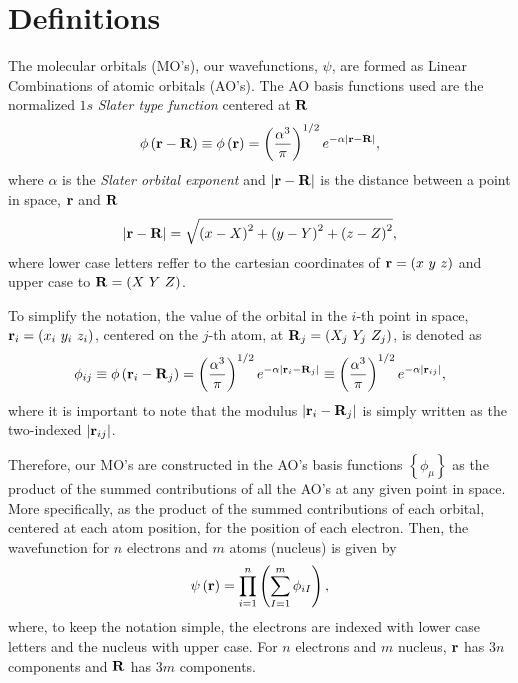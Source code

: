 \graphicspath{{./figures/}}

\section{Definitions}
The molecular orbitals (MO's), our wavefunctions, $\psi$, are formed as Linear
Combinations of atomic orbitals (AO's).
The AO basis functions used are the normalized $1s$ \textit{Slater type function} 
centered at $\boldsymbol{\mathrm{R}}$
\begin{equation}
    \phi \left( \boldsymbol{\mathrm{r}} - \boldsymbol{\mathrm{R}} \right) \equiv
    \phi \left( \boldsymbol{\mathrm{r}} \right) =
    \left( \frac{\alpha^3}{\pi} \right)^{1 /2}
    e^{-\alpha \left| \boldsymbol{\mathrm{r}} - \boldsymbol{\mathrm{R}} \right|}
    ,
\end{equation}
where $\alpha$ is the \textit{Slater orbital exponent} and 
$\left| \boldsymbol{\mathrm{r}} - \boldsymbol{\mathrm{R}} \right|$ is the distance between a point in space,
$ \boldsymbol{\mathrm{r}}$ and $ \boldsymbol{\mathrm{R}}$ 
\begin{equation} \label{eq:definition-mod-rR}
    \left| \boldsymbol{\mathrm{r}} - \boldsymbol{\mathrm{R}} \right|
    =
    \sqrt{\left( x - X \right)^{2} + \left( y - Y \right)^{2} + \left( z - Z \right)^{2}}
    ,
\end{equation}
where lower case letters reffer to the cartesian coordinates of 
$ \boldsymbol{\mathrm{r}} = \left( x\ y\ z \right)$ and upper case to 
$ \boldsymbol{\mathrm{R}} = \left( X\ Y\ Z \right)$.

To simplify the notation, the value of the orbital in the $i$-th point in space,
$\mat{r}_i = \left( x_i\ y_i\ z_i \right)$, centered on the $j$-th atom, at
$\boldsymbol{\mathrm{R}}_j = \left( X_j\ Y_j\ Z_j \right)$, is denoted as 
\begin{equation}
    \phi_{ij} \equiv
    \phi \left( \boldsymbol{\mathrm{r}}_i - \boldsymbol{\mathrm{R}}_j \right) =
    \left( \frac{\alpha^3}{\pi} \right)^{1 /2}
    e^{-\alpha \left| \boldsymbol{\mathrm{r}}_i - \boldsymbol{\mathrm{R}}_j \right|}
    \equiv
    \left( \frac{\alpha^3}{\pi} \right)^{1 /2}
    e^{-\alpha \left| \boldsymbol{\mathrm{r}}_{ij} \right|}
    ,
\end{equation}
where it is important to note that the modulus $\left| \boldsymbol{\mathrm{r}}_{i} - \boldsymbol{\mathrm{R}}_{j} \right|$
is simply written as the two-indexed $\left| \boldsymbol{\mathrm{r}}_{ij} \right|$.

Therefore, our MO's are constructed in the AO's basis functions $\left\{ \phi_{\mu} \right\}$
as the product of the summed contributions of all the AO's at any given point
in space. More specifically, as the product of the summed contributions of each
orbital, centered at each atom position, for the position of each electron.
Then, the wavefunction for $n$ electrons and $m$ atoms (nucleus) is given by 
\begin{equation} \label{eq:definition-psi}
    \psi \left( \boldsymbol{\mathrm{r}} \right) =
    \prod_{i=1}^{n} \left( \sum_{I=1}^{m} \phi_{iI} \right)
    ,
\end{equation}
where, to keep the notation simple, the electrons are indexed with lower case
letters and the nucleus with upper case.
For $n$ electrons and $m$ nucleus, $\boldsymbol{\mathrm{r}}$ has $3n$ components and
$\boldsymbol{\mathrm{R}}$ has $3m$ components.

